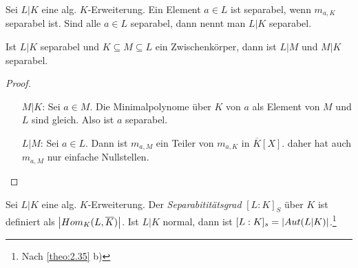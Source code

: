 \documentclass[../main.tex]{subfiles}
\begin{document}
\begin{definition} \label{theo:2.43}
    Sei $L|K$ eine alg. $K$-Erweiterung.
    Ein Element $a\in L$ ist separabel, wenn $m_{a,K}$ separabel ist.
    Sind alle $a\in L$ separabel, dann nennt man $L|K$ separabel.
\end{definition}

\begin{lemma}
    Ist $L|K$ separabel und $K\subseteq M \subseteq L$ ein Zwischenkörper, dann ist $L|M$ und $M|K$ separabel.
\end{lemma}
\begin{proof}
    \begin{enumerate}
        \item[$M|K$:] Sei $a\in M$. Die Minimalpolynome über $K$ von $a$ als Element von $M$ und $L$ sind gleich. Also ist $a$ separabel.
        \item[$L|M$:] Sei $a\in L$. Dann ist $m_{a,M}$ ein Teiler von $m_{a,K}$ in $\overline{K}[X]$.
        daher hat auch $m_{a,M}$ nur einfache Nullstellen.
    \end{enumerate}
\end{proof}

\begin{definition}
    Sei $L|K$ eine alg. $K$-Erweiterung.
    Der \emph{Separabititätsgrad} $[L:K]_S$ über $K$ ist definiert als $\left\vert Hom_K(L,\overline{K}) \right\vert$.
    Ist $L|K$ normal, dann ist $[L:K]_s = \left\vert Aut(L|K) \right\vert$.\footnote{Nach \cref{theo:2.35} b)} 
\end{definition}
\end{document}
